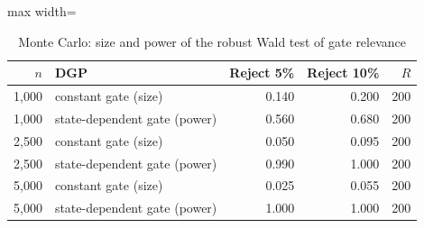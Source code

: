 \begin{table}[!htbp]\centering\small
\caption{Monte Carlo: size and power of the robust Wald test of gate relevance}\label{tab:mc_tests}
\begin{adjustbox}{max width=\textwidth}
\begin{tabular}{rlrrr}
\toprule
$n$ & DGP & Reject 5\% & Reject 10\% & $R$\\
\midrule
1,000 & constant gate (size) & 0.140 & 0.200 & 200\\
1,000 & state-dependent gate (power) & 0.560 & 0.680 & 200\\
2,500 & constant gate (size) & 0.050 & 0.095 & 200\\
2,500 & state-dependent gate (power) & 0.990 & 1.000 & 200\\
5,000 & constant gate (size) & 0.025 & 0.055 & 200\\
5,000 & state-dependent gate (power) & 1.000 & 1.000 & 200\\
\bottomrule
\end{tabular}
\end{adjustbox}
\end{table}